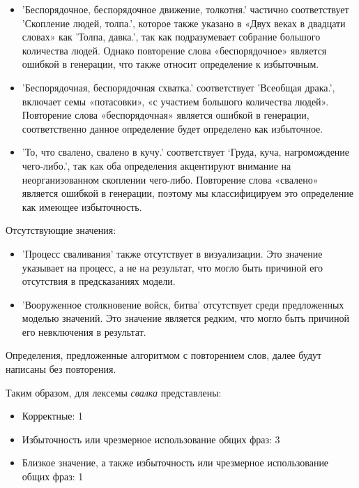 \begin{itemize}
    \item ’Беспорядочное, беспорядочное движение, толкотня.’ частично соответствует
’Скопление людей, толпа.’, которое также указано в «Двух веках в двадцати словах» как ’Толпа, давка.’,
так как подразумевает собрание большого количества людей.
Однако повторение слова «беспорядочное» является ошибкой в генерации,
что также относит определение к избыточным.

    \item ’Беспорядочная, беспорядочная схватка.’ соответствует
’Всеобщая драка.’, включает семы «потасовки», «с участием большого количества людей».
Повторение слова «беспорядочная» является ошибкой в генерации,
соответственно данное определение будет определено как избыточное.

    \item ’То, что свалено, свалено в кучу.’ соответствует
‘Груда, куча, нагромождение чего-либо.’, так как оба определения акцентируют внимание
на неорганизованном скоплении чего-либо.
Повторение слова «свалено» является ошибкой в генерации,
поэтому мы классифицируем это определение как имеющее избыточность.
\end{itemize}

Отсутствующие значения:

\begin{itemize}
    \item ’Процесс сваливания’ также отсутствует в визуализации.
Это значение указывает на процесс, а не на результат, что могло быть причиной его отсутствия в предсказаниях модели.

    \item ’Вооруженное столкновение войск, битва’ отсутствует среди предложенных моделью значений.
Это значение является редким, что могло быть причиной его невключения в результат.
\end{itemize}

Определения, предложенные алгоритмом с повторением слов, далее будут написаны без повторения.

Таким образом, для лексемы \textit{свалка} представлены:

\begin{itemize}
    \item Корректные: 1
    \item Избыточность или чрезмерное использование общих фраз: 3
    \item Близкое значение, а также избыточность или чрезмерное использование общих фраз: 1
\end{itemize}

